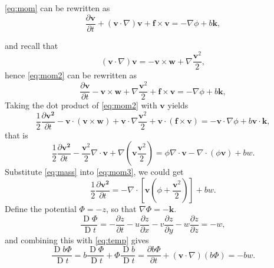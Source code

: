 \documentclass[a4paper]{article}
\begin{document}
\begin{enumerate}[label=\textbf{\arabic*.}]
\begin{enumerate}[label=(\alph*)]
		 \eqref{eq:mom} can be rewritten as
		\begin{equation}\label{eq:mom2}
		\frac{\partial \bm{v}}{\partial t}+(\bm v\cdot \nabla)\bm v+\bm{f}\times \bm{v}=-\nabla \phi +b \bm{k},
		\end{equation}
		
		and recall that 
		$$(\bm v\cdot \nabla )\bm v=-\bm v\times \bm w+\nabla \frac{\bm v^2}{2},$$
		hence \eqref{eq:mom2} can be rewritten as
		\begin{equation}\label{eq:mom2}
		\frac{\partial \bm{v}}{\partial t}-\bm v\times \bm w+\nabla \frac{\bm v^2}{2}+\bm{f}\times \bm{v}=-\nabla \phi +b \bm{k},
		\end{equation}
		Taking the dot product of \eqref{eq:mom2} with $\bm v$ yields
		\begin{equation*}
			\frac{1}{2}\frac{\partial \bm{v^2}}{\partial t}-\bm v\cdot (\bm v\times \bm w)+\bm v\cdot\nabla \frac{\bm v^2}{2}+\bm v \cdot (\bm{f}\times \bm{v})=-\bm v\cdot\nabla \phi +b \bm v\cdot\bm{k},
		\end{equation*}
		that is
		\begin{equation}\label{eq:mom3}
			\frac{1}{2}\frac{\partial \bm{v^2}}{\partial t} - \frac{\bm v^2}{2} \nabla \cdot \bm v+\nabla \left( \bm v \frac{\bm v^2}{2}\right) =\phi \nabla \cdot \bm v-\nabla \cdot (\phi \bm v)+bw.
		\end{equation}
		Substitute \eqref{eq:mass} into \eqref{eq:mom3}, we could get
			\begin{equation}\label{eq:energy_1}
					\frac{1}{2}\frac{\partial \bm{v^2}}{\partial t}=-\nabla \cdot \left[ \bm v \left(\phi +\frac{\bm v^2}{2} \right) \right] +bw.
			\end{equation}
		Define the potential $\Phi = -z$, so that
$\nabla \Phi = -\bm k$.
		\begin{equation}
			\frac{\operatorname{D}\Phi}{\operatorname{D}t}=-\frac{\partial z}{\partial t}-u\frac{\partial z}{\partial x}-v\frac{\partial z}{\partial y}-w\frac{\partial z}{\partial z}=-w,
		\end{equation}
		and combining this with \eqref{eq:temp} gives
		\begin{equation}\label{eq:potential_deriv}
			\frac{\operatorname{D}b\Phi}{\operatorname{D}t}=b\frac{\operatorname{D}\Phi}{\operatorname{D}t}+\Phi \frac{\operatorname{D}b}{\operatorname{D}t}=\frac{\partial b\Phi }{\partial t}+(\bm v\cdot \nabla)(b\Phi) = -bw.
		\end{equation}
	

\end{enumerate}
\end{enumerate}
\end{document}
